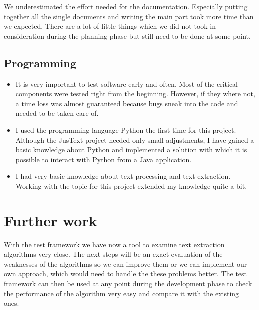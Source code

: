 We underestimated the effort needed for the documentation. Especially putting together all the single documents and writing the main part took more time than we expected. There are a lot of little things which we did not took in consideration during the planning phase but still need to be done at some point.

\subsection{Programming}
\begin{itemize}
\item It is very important to test software early and often. Most of the critical components were tested right from the beginning. However, if they where not, a time loss was almost guaranteed because bugs sneak into the code and needed to be taken care of.

\item I used the programming language Python the first time for this project. Although the JusText project needed only small adjustments, I have gained a basic knowledge about Python and implemented a solution with which it is possible to interact with Python from a Java application.

\item I had very basic knowledge about text processing and text extraction. Working with the topic for this project extended my knowledge quite a bit.


\end{itemize}

\section{Further work}

With the test framework we have now a tool to examine text extraction algorithms very close. The next steps will be an exact evaluation of the weaknesses of the algorithms so we can improve them or we can implement our own approach, which would need to handle the these problems better. The test framework can then be used at any point during the development phase to check the performance of the algorithm very easy and compare it with the existing ones.  


